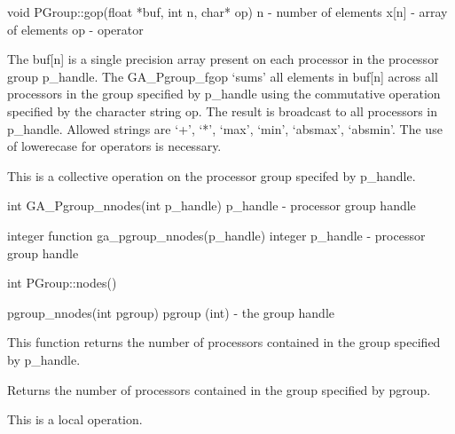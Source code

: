 \documentclass[12pt]{article}
\begin{document}
\begin{cxxapi}
void PGroup::gop(float *buf, int n, char* op)
   n              - number of elements                                     \access{[input]}
   x[n]           - array of elements                               
   op             - operator                                               \access{[input]}
\end{cxxapi}

\begin{desc}

The buf[n] is a single precision array present on each processor in the processor group p_handle. The GA_Pgroup_fgop `sums' all elements in buf[n] across all processors in the group specified by p_handle using the commutative operation specified by the character string op.  The result is broadcast to all processors in p_handle. Allowed strings are `+', `*', `max', `min', `absmax', `absmin'. The use of lowerecase for operators is necessary.

This is a collective operation on the processor group specifed by p_handle. 
\end{desc}


\begin{capi}
int GA_Pgroup_nnodes(int p_handle)
   p_handle                      - processor group handle                  \access{[input]} 
\end{capi}

\begin{fapi}
integer function ga_pgroup_nnodes(p_handle)
   integer p_handle              - processor group handle                  \access{[input]} 
\end{fapi}

\begin{cxxapi}
int PGroup::nodes()
\end{cxxapi}

\begin{pyapi}
pgroup_nnodes(int pgroup) 
   pgroup (int)                  - the group handle 
\end{pyapi}


\begin{desc}

This function returns the number of processors contained in the group specified by p_handle.

Returns the number of processors contained in the group specified by 
pgroup.

This is a local operation.
\end{desc}
\end{document}
